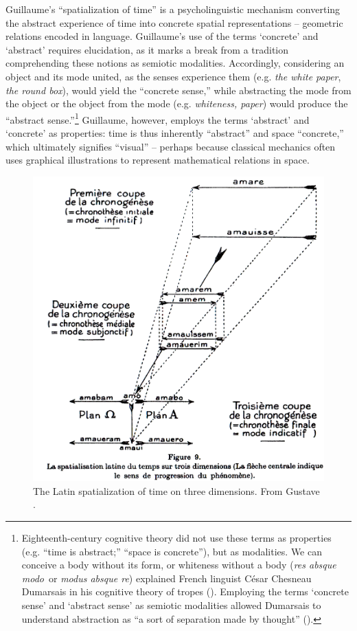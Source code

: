 \documentclass[english,output=paper,colorlinks,citecolor=brown]{../langscibook}
\begin{document}
Guillaume’s “spatialization of time” is a psycholinguistic mechanism converting the abstract experience of time into concrete spatial representations -- geometric relations encoded in language. Guillaume’s use of the terms ‘concrete’ and ‘abstract’ requires elucidation, as it marks a break from a tradition comprehending these notions as semiotic modalities. Accordingly, considering an object and its mode united, as the senses experience them (e.g. \textit{the white paper}, \textit{the round box}), would yield the “concrete sense,” while abstracting the mode from the object or the object from the mode (e.g. \textit{whiteness, paper}) would produce the “abstract sense.”\footnote{Eighteenth-century cognitive theory did not use these terms as properties (e.g. “time is abstract;” “space is concrete”), but as modalities. We can conceive a body without its form, or whiteness without a body (\textit{res absque modo}~or \textit{modus absque re}) explained French linguist César Chesneau Dumarsais in his cognitive theory of tropes (\citeyear{Dumarsais1730}). Employing the terms ‘concrete sense’ and ‘abstract sense’ as semiotic modalities allowed Dumarsais to understand abstraction as “a sort of separation made by thought” (\citeyear[260]{Dumarsais1730}).} Guillaume, however, employs the terms ‘abstract’ and ‘concrete’ as properties: time is thus inherently “abstract” and space “concrete,” which ultimately signifies “visual” -- perhaps because classical mechanics often uses graphical illustrations to represent mathematical relations in space.

\begin{figure}[b]
\includegraphics[height=.4\textheight]{figures/03/Ch3Fig1.png}
\caption{The Latin spatialization of time on three dimensions. From Gustave \citet[37]{Guillaume1965Archi}.\label{fig:3:1}}
\end{figure}
\end{document}
